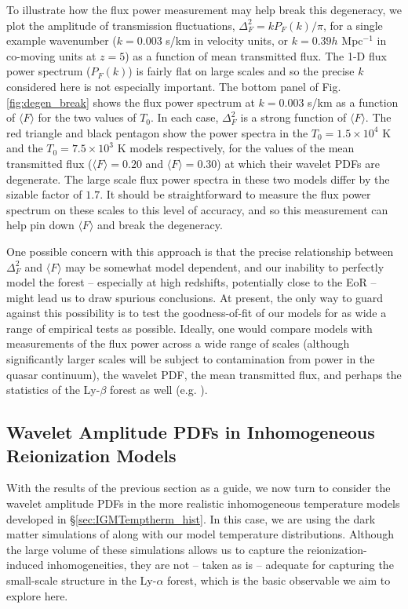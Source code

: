 To illustrate how the flux power measurement may help break this degeneracy, we plot the
amplitude of transmission fluctuations, $\Delta^2_F =k P_F(k)/\pi$, for a single example wavenumber ($k=0.003$ s/km in velocity units, or $k=0.39 h$ Mpc$^{-1}$
in co-moving units at $z=5$) as a function of mean transmitted flux.  The 1-D flux power spectrum ($P_F(k)$) is fairly flat on large scales and so the precise $k$ considered
here is not especially important.  The bottom panel of Fig. \ref{fig:degen_break} shows the flux power spectrum at $k=0.003$ s/km
as a function of $\langle F \rangle$ for the two values of $T_0$. In each case, $\Delta^2_F$ is a strong function of $\langle F \rangle$. The red
triangle and black pentagon show the power spectra in the $T_0 = 1.5 \times 10^4$ K and the $T_0 = 7.5 \times 10^3$ K
models respectively, for the values of the mean transmitted flux ($\langle F \rangle=0.20$ and $\langle F \rangle=0.30$) at which their wavelet
PDFs are degenerate. The large scale flux power spectra in these two models differ by the sizable factor of $1.7$. It should be
straightforward to measure the flux power spectrum on these scales to this level of accuracy, and so this measurement can help
pin down $\langle F \rangle$ and break the degeneracy.

One possible concern with this approach is that the precise relationship between $\Delta^2_F$ and $\langle F \rangle$ may be somewhat model dependent, and our inability to perfectly model the forest -- especially at high redshifts, potentially close to the EoR -- 
might lead us to draw spurious conclusions. At present, the only way to guard against this possibility is to test the goodness-of-fit
of our models for as wide a range of empirical tests as possible. Ideally, one would compare models with measurements of the
flux power across a wide range of scales (although significantly larger scales will be subject to contamination from power in
the quasar continuum), the wavelet PDF, the mean transmitted
flux, and perhaps the statistics of the Ly-$\beta$ forest as well (e.g. \citealt{Dijkstra:2003pd,Furlanetto:2009kr}).  


\subsection{Wavelet Amplitude PDFs in Inhomogeneous Reionization Models}
\label{sec:IGMTempwave_inhomog}

With the results of the previous section as a guide, we now turn to consider the wavelet amplitude PDFs in the more realistic inhomogeneous temperature models developed 
in \S \ref{sec:IGMTemptherm_hist}. In this case, we are using the dark matter simulations of \citet{McQuinn:2007dy} along with our model temperature
distributions.
Although the large volume of these simulations allows us to capture the reionization-induced inhomogeneities, they 
are not -- taken as is -- adequate
for capturing the small-scale structure in the Ly-$\alpha$ forest, which is the basic observable we aim to explore here. 

